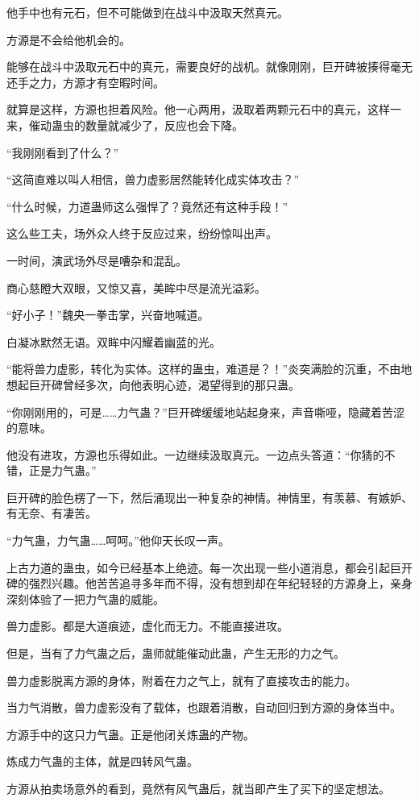 \begin{this_body}
他手中也有元石，但不可能做到在战斗中汲取天然真元。

方源是不会给他机会的。

能够在战斗中汲取元石中的真元，需要良好的战机。就像刚刚，巨开碑被揍得毫无还手之力，方源才有空暇时间。

就算是这样，方源也担着风险。他一心两用，汲取着两颗元石中的真元，这样一来，催动蛊虫的数量就减少了，反应也会下降。

“我刚刚看到了什么？”

“这简直难以叫人相信，兽力虚影居然能转化成实体攻击？”

“什么时候，力道蛊师这么强悍了？竟然还有这种手段！”

这么些工夫，场外众人终于反应过来，纷纷惊叫出声。

一时间，演武场外尽是嘈杂和混乱。

商心慈瞪大双眼，又惊又喜，美眸中尽是流光溢彩。

“好小子！”魏央一拳击掌，兴奋地喊道。

白凝冰默然无语。双眸中闪耀着幽蓝的光。

“能将兽力虚影，转化为实体。这样的蛊虫，难道是？！”炎突满脸的沉重，不由地想起巨开碑曾经多次，向他表明心迹，渴望得到的那只蛊。

“你刚刚用的，可是……力气蛊？”巨开碑缓缓地站起身来，声音嘶哑，隐藏着苦涩的意味。

他没有进攻，方源也乐得如此。一边继续汲取真元。一边点头答道：“你猜的不错，正是力气蛊。”

巨开碑的脸色楞了一下，然后涌现出一种复杂的神情。神情里，有羡慕、有嫉妒、有无奈、有凄苦。

“力气蛊，力气蛊……呵呵。”他仰天长叹一声。

上古力道的蛊虫，如今已经基本上绝迹。每一次出现一些小道消息，都会引起巨开碑的强烈兴趣。他苦苦追寻多年而不得，没有想到却在年纪轻轻的方源身上，亲身深刻体验了一把力气蛊的威能。

兽力虚影。都是大道痕迹，虚化而无力。不能直接进攻。

但是，当有了力气蛊之后，蛊师就能催动此蛊，产生无形的力之气。

兽力虚影脱离方源的身体，附着在力之气上，就有了直接攻击的能力。

当力气消散，兽力虚影没有了载体，也跟着消散，自动回归到方源的身体当中。

方源手中的这只力气蛊。正是他闭关炼蛊的产物。

炼成力气蛊的主体，就是四转风气蛊。

方源从拍卖场意外的看到，竟然有风气蛊后，就当即产生了买下的坚定想法。


\end{this_body}
